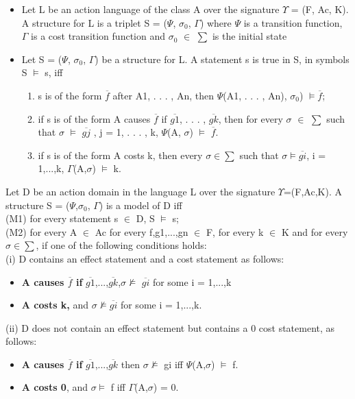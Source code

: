 \documentclass[11pt]{article}
\begin{document}
\begin{itemize}
\begin{enumerate}
\end{enumerate}

\item 	Let L be an action language of the class A over the signature $\Upsilon$ = (F, Ac, K). A structure for L is a triplet S = ($\Psi$, $\sigma_{0}$, $\Gamma$) where $\Psi$ is a transition function, $\Gamma$ is a cost transition function  and $\sigma_{0}$ $\in$ $\sum$ is the initial state

\item 	Let S = ($\Psi$, $\sigma_{0}$, $\Gamma$) be a structure for L. A statement s is true in S, in symbols S   $\vDash$   s, iff 
\begin{enumerate}
\item s is of the form $\overline{f}$ after A1, . . . , An, then $\Psi$(A1, . . . , An), $\sigma_{0}$)   $\vDash \overline{f}$;

\item if s is of the form A causes $\overline{f}$ if $\overline{g1}$, . . . , $\overline{gk}$, then for every $\sigma$ $\in$ $\sum$ such that $\sigma$   $\vDash$   $\overline{gj}$ , j = 1, . . . , k, $\Psi$(A, $\sigma$)   $\vDash$   $\overline{f}$.

\item if s is of the form A costs k, then every $\sigma \in \sum$ such that $\sigma \vDash \overline{gi}$, i = 1,...,k, $\Gamma$(A,$\sigma$) $\vDash$ k.
\end{enumerate}
 

\end{itemize}
Let D be an action domain in the language L over the signature $\Upsilon$=(F,Ac,K). A structure S = ($\Psi$,$\sigma_{0}$, $\Gamma$) is a model of D iff\\
(M1) for every statement s $\in$ D, S $\vDash$ s;\\
(M2) for every A $\in$ Ac for every f,g1,...,gn $\in$ F, for every k $\in$ K and for every $\sigma\in\sum$, if one of the following conditions holds:
\\
(i) D contains an effect statement and a cost statement as follows:
\begin{itemize}
	\item {\bfseries A causes $\overline{f}$ if} $\overline{g1}$,...,$\overline{gk}$,$\sigma \nvDash$  $\overline{gi}$ for some i = 1,...,k

	\item {\bfseries A costs k,} and $\sigma \nvDash \overline{gi}$ for some i = 1,...,k.
\end{itemize}
(ii) D does not contain an effect statement but contains a 0 cost statement, as follows:
\begin{itemize}
\item {\bfseries A causes $\overline{f}$ if} $\overline{g1}$,...,$\overline{gk}$ then $\sigma \nvDash$  gi iff $\Psi$(A,$\sigma$) $\vDash$ f.

\item {\bfseries A costs 0}, and $\sigma \vDash$ f iff $\Gamma$(A,$\sigma$) = 0.
\end{itemize}
\end{document}
